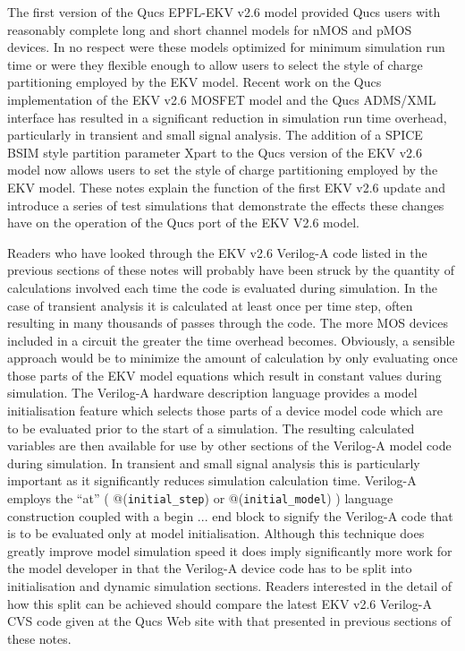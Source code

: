 \newpage 
{}

The first version of the Qucs EPFL-EKV v2.6 model provided Qucs users
with reasonably complete long and short channel models for nMOS and
pMOS devices.  In no respect were these models optimized for minimum
simulation run time or were they flexible enough to allow users to
select the style of charge partitioning employed by the EKV
model. Recent work on the Qucs implementation of the EKV v2.6 MOSFET
model and the Qucs ADMS/XML interface has resulted in a significant
reduction in simulation run time overhead, particularly in transient
and small signal analysis. The addition of a SPICE BSIM style
partition parameter Xpart to the Qucs version of the EKV v2.6 model
now allows users to set the style of charge partitioning employed by
the EKV model. These notes explain the function of the first EKV v2.6
update and introduce a series of test simulations that demonstrate the
effects these changes have on the operation of the Qucs port of the
EKV V2.6 model.


Readers who have looked through the EKV v2.6 Verilog-A code listed in
the previous sections of these notes will probably have been struck by
the quantity of calculations involved each time the code is evaluated
during simulation.  In the case of transient analysis it is calculated
at least once per time step, often resulting in many thousands of
passes through the code. The more MOS devices included in a circuit
the greater the time overhead becomes.  Obviously, a sensible approach
would be to minimize the amount of calculation by only evaluating once
those parts of the EKV model equations which result in constant values
during simulation. The Verilog-A hardware description language
provides a model initialisation feature which selects those parts of a
device model code which are to be evaluated prior to the start of a
simulation. The resulting calculated variables are then available for
use by other sections of the Verilog-A model code during
simulation. In transient and small signal analysis this is
particularly important as it significantly reduces simulation
calculation time.  Verilog-A employs the ``at'' (
@(\verb|initial_step|) or @(\verb|initial_model|) ) language
construction coupled with a begin ... end block to signify the
Verilog-A code that is to be evaluated only at model
initialisation. Although this technique does greatly improve model
simulation speed it does imply significantly more work for the model
developer in that the Verilog-A device code has to be split into
initialisation and dynamic simulation sections. Readers interested in
the detail of how this split can be achieved should compare the latest
EKV v2.6 Verilog-A CVS code given at the Qucs Web site with that
presented in previous sections of these notes.

